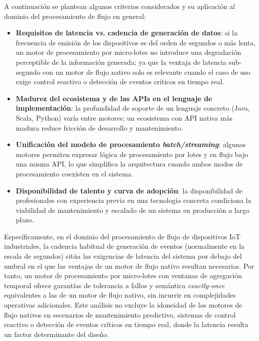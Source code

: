 A continuación se plantean algunos criterios considerados y su aplicación al dominio del procesamiento de flujo en general:

\begin{itemize}
    \item \textbf{Requisitos de latencia vs. cadencia de generación de datos}: si la frecuencia de emisión de los dispositivos es del orden de segundos o más lenta, un motor de procesamiento por micro-lotes no introduce una degradación perceptible de la información generada; ya que la ventaja de latencia sub-segundo con un motor de flujo nativo solo es relevante cuando el caso de uso exige control reactivo o detección de eventos críticos en tiempo real.
    \item \textbf{Madurez del ecosistema y de las APIs en el lenguaje de implementación}: la profundidad de soporte de un lenguaje concreto (Java, Scala, Python) varía entre motores; un ecosistema con API nativa más madura reduce fricción de desarrollo y mantenimiento.
    \item \textbf{Unificación del modelo de procesamiento \textit{batch/streaming}}: algunos motores permiten expresar lógica de procesamiento por lotes y en flujo bajo una misma API, lo que simplifica la arquitectura cuando ambos modos de procesamiento coexisten en el sistema.
    \item \textbf{Disponibilidad de talento y curva de adopción}: la disponibilidad de profesionales con experiencia previa en una tecnología concreta condiciona la viabilidad de mantenimiento y escalado de un sistema en producción a largo plazo.
\end{itemize}

Específicamente, en el dominio del procesamiento de flujo de dispositivos IoT industriales, la cadencia habitual de generación de eventos (normalmente en la escala de segundos) sitúa las exigencias de latencia del sistema por debajo del umbral en el que las ventajas de un motor de flujo nativo resultan necesarias. Por tanto, un motor de procesamiento por micro-lotes con ventanas de agregación temporal ofrece garantías de tolerancia a fallos y semántica \textit{exactly-once} equivalentes a las de un motor de flujo nativo, sin incurrir en complejidades operativas adicionales. Este análisis no excluye la idoneidad de los motores de flujo nativos en escenarios de mantenimiento predictivo, sistemas de control reactivo o detección de eventos críticos en tiempo real, donde la latencia resulta un factor determinante del diseño.

